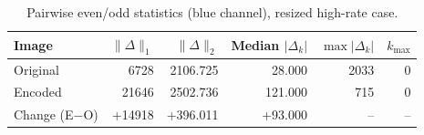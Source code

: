 
\begin{table}[H]\centering
\caption{Pairwise even/odd statistics (blue channel), resized high-rate case.}
\begin{tabular}{lrrrrr}
\toprule
Image & $\|\Delta\|_{1}$ & $\|\Delta\|_{2}$ & Median $|\Delta_k|$ & $\max |\Delta_k|$ & $k_{\max}$ \\
\midrule
Original & 6728 & 2106.725 & 28.000 & 2033 & 0 \\
Encoded  & 21646 & 2502.736 & 121.000 & 715 & 0 \\
\midrule
Change (E$-$O) & +14918 & +396.011 & +93.000 & -- & -- \\
\bottomrule
\end{tabular}
\end{table}
